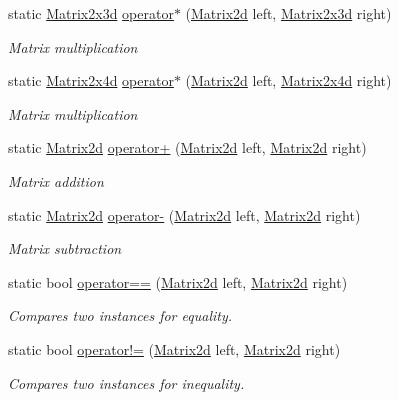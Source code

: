 \begin{DoxyCompactItemize}
static \hyperlink{struct_open_t_k_1_1_matrix2x3d}{Matrix2x3d} \hyperlink{struct_open_t_k_1_1_matrix2d_a78dd74b536c5550407d55ef08cb054e7}{operator$\ast$} (\hyperlink{struct_open_t_k_1_1_matrix2d}{Matrix2d} left, \hyperlink{struct_open_t_k_1_1_matrix2x3d}{Matrix2x3d} right)
\begin{DoxyCompactList}\small\item\em Matrix multiplication \end{DoxyCompactList}\item 
static \hyperlink{struct_open_t_k_1_1_matrix2x4d}{Matrix2x4d} \hyperlink{struct_open_t_k_1_1_matrix2d_a9840b38a37d00d96723bd0f6f4950347}{operator$\ast$} (\hyperlink{struct_open_t_k_1_1_matrix2d}{Matrix2d} left, \hyperlink{struct_open_t_k_1_1_matrix2x4d}{Matrix2x4d} right)
\begin{DoxyCompactList}\small\item\em Matrix multiplication \end{DoxyCompactList}\item 
static \hyperlink{struct_open_t_k_1_1_matrix2d}{Matrix2d} \hyperlink{struct_open_t_k_1_1_matrix2d_a075939105172d6beed975f4bd42d654f}{operator+} (\hyperlink{struct_open_t_k_1_1_matrix2d}{Matrix2d} left, \hyperlink{struct_open_t_k_1_1_matrix2d}{Matrix2d} right)
\begin{DoxyCompactList}\small\item\em Matrix addition \end{DoxyCompactList}\item 
static \hyperlink{struct_open_t_k_1_1_matrix2d}{Matrix2d} \hyperlink{struct_open_t_k_1_1_matrix2d_afbb785077c3059cf5342947305c7c5ef}{operator-\/} (\hyperlink{struct_open_t_k_1_1_matrix2d}{Matrix2d} left, \hyperlink{struct_open_t_k_1_1_matrix2d}{Matrix2d} right)
\begin{DoxyCompactList}\small\item\em Matrix subtraction \end{DoxyCompactList}\item 
static bool \hyperlink{struct_open_t_k_1_1_matrix2d_ad4c1bb9c3dd412d90095763e40382aa4}{operator==} (\hyperlink{struct_open_t_k_1_1_matrix2d}{Matrix2d} left, \hyperlink{struct_open_t_k_1_1_matrix2d}{Matrix2d} right)
\begin{DoxyCompactList}\small\item\em Compares two instances for equality. \end{DoxyCompactList}\item 
static bool \hyperlink{struct_open_t_k_1_1_matrix2d_a80373b3383cd1595c6314da74832a37b}{operator!=} (\hyperlink{struct_open_t_k_1_1_matrix2d}{Matrix2d} left, \hyperlink{struct_open_t_k_1_1_matrix2d}{Matrix2d} right)
\begin{DoxyCompactList}\small\item\em Compares two instances for inequality. \end{DoxyCompactList}\end{DoxyCompactItemize}
